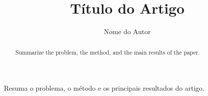 \documentclass[12pt]{article}
\title{Título do Artigo}
\author{Nome do Autor\inst{1}}
\begin{document}
\maketitle

\begin{abstract}
Summarize the problem, the method, and the main results of the paper.
\end{abstract}

\begin{resumo}
Resuma o problema, o método e os principais resultados do artigo.
\end{resumo}







\typeout{}

\end{document}
